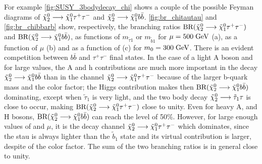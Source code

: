 For example \autoref{fig:SUSY_3bodydecay_chi} shows a couple of the possible Feyman diagrams of $\tilde{\chi}^{0}_{2} \longrightarrow \tilde{\chi}^{0}_{1}\tau^{+}\tau^{-}$ and $\tilde{\chi}^{0}_{2} \longrightarrow \tilde{\chi}^{0}_{1} b \bar{b}$. \autoref{fig:br_chitautau} and \autoref{fig:br_chibbarb} show, respectively, the branching ratios $\text{BR}(\tilde{\chi}^{0}_{2} \longrightarrow \tilde{\chi}^{0}_{1}\tau^{+}\tau^{-} )$ and $\text{BR}(\tilde{\chi}^{0}_{2} \longrightarrow \tilde{\chi}^{0}_{1} b \bar{b})$, as functions of $m_{\widetilde{\tau}1}$ or $m_{\widetilde{b}1}$ for $\mu = 500\;\text{Ge}\kern-0.06667em\text{V}$ (a), as a function of $\mu$ (b) and as a function of \tanbeta (c) for $m_{0} = 300\;\text{Ge}\kern-0.06667em\text{V}$. There is an evident competition between $b\bar{b}$ and $\tau^{+}\tau^{-}$ final states. In the case of a light A boson and for large \tanbeta values, the A and h contributions are much more important in the decay $\tilde{\chi}^{0}_{2} \longrightarrow \tilde{\chi}^{0}_{1} b \bar{b}$ than in the channel $\tilde{\chi}^{0}_{2} \longrightarrow \tilde{\chi}^{0}_{1}\tau^{+}\tau^{-} $ because of the larger b-quark mass and the color factor; the Higgs contribution makes then $\text{BR}(\tilde{\chi}^{0}_{2} \longrightarrow \tilde{\chi}^{0}_{1} b \bar{b})$ dominating, except when $\widetilde{\tau}_{1}$ is very light, and the two body decay $\tilde{\chi}^{0}_{2} \longrightarrow \tilde{\tau}_{1} \tau$ is close to occur, making $\text{BR}(\tilde{\chi}^{0}_{2} \longrightarrow \tilde{\chi}^{0}_{1}\tau^{+}\tau^{-} )$ close to unity. Even for heavy A, and H bosons, $\text{BR}(\tilde{\chi}^{0}_{2} \longrightarrow \tilde{\chi}^{0}_{1} b \bar{b})$ can reach the level of 50\%. However, for large enough values of \tanbeta and $\mu$, it is the decay channel $\tilde{\chi}^{0}_{2} \longrightarrow \tilde{\chi}^{0}_{1}\tau^{+}\tau^{-} $ which dominates, since the stau is always lighter than the $\widetilde{b}_{1}$ state and its virtual contribution is larger, despite of the color factor. The sum of the two branching ratios is in general close to unity.

